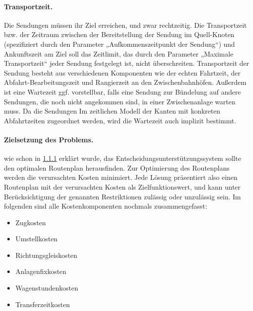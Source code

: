 \paragraph{Transportzeit.}
Die Sendungen müssen ihr Ziel erreichen, und zwar rechtzeitig. Die Transportzeit bzw. der Zeitraum zwischen der Bereitstellung der Sendung im Quell-Knoten (spezifiziert durch den Parameter „Aufkommenszeitpunkt der Sendung“) und Ankunftszeit am Ziel soll das Zeitlimit, das durch den Parameter „Maximale Transportzeit“ jeder Sendung festgelegt ist, nicht überschreiten. Transportzeit der Sendung besteht aus verschiedenen Komponenten wie der echten Fahrtzeit, der Abfahrt-Bearbeitungszeit und Rangierzeit an den Zwischenbahnhöfen. Außerdem ist eine Wartezeit ggf. vorstellbar, falls eine Sendung zur Bündelung auf andere Sendungen, die noch nicht angekommen sind, in einer Zwischenanlage warten muss. Da die Sendungen Im zeitlichen Modell der Kanten mit konkreten Abfahrtzeiten zugeordnet werden, wird die Wartezeit auch implizit bestimmt.

\paragraph{Zielsetzung des Problems.}
wie schon in \hyperref[subsec:routenplan]{1.1.1} erklärt wurde, das Entscheidungsunterstützungssystem sollte den optimalen Routenplan herausfinden. Zur Optimierung des Routenplans werden die verursachten Kosten minimiert. Jede Lösung präsentiert also einen Routenplan mit der verursachten Kosten als Zielfunktionswert, und kann unter Berücksichtigung der genannten Restriktionen zulässig oder unzulässig sein. Im folgenden sind alle Kostenkomponenten nochmals zusammengefasst:

\begin{itemize}
    \item Zugkosten
    \item Umstellkosten
    \item Richtungsgleiskosten
    \item Anlagenfixkosten
    \item Wagenstundenkosten
    \item Transferzeitkosten
\end{itemize}


